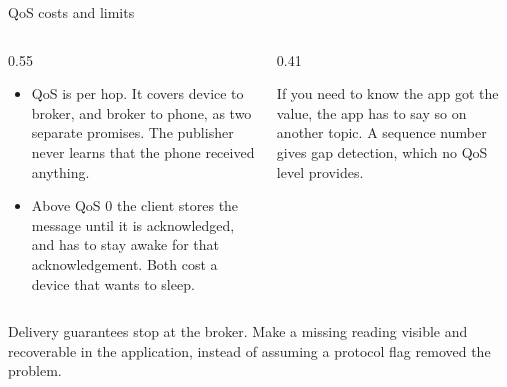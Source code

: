 \documentclass[10pt,aspectratio=169,t]{beamer}
\begin{document}
\begin{frame}[embedded,eyebrow=MQTT]{QoS costs and limits}
  \vskip 2mm
  \begin{columns}[T]
    \begin{column}{0.55\textwidth}
      \begin{itemize}
        \item QoS is per hop. It covers device to broker, and broker to phone, as two separate promises. The publisher never learns that the phone received anything.
        \item Above QoS 0 the client stores the message until it is acknowledged, and has to stay awake for that acknowledgement. Both cost a device that wants to sleep.
      \end{itemize}
    \end{column}
    \begin{column}{0.41\textwidth}
      \begin{hint}
        If you need to know the app got the value, the app has to say so on another topic. A sequence number gives gap detection, which no QoS level provides.
      \end{hint}
    \end{column}
  \end{columns}
  \begin{takeaway}{Delivery guarantees stop at the broker.}
    Make a missing reading visible and recoverable in the application, instead of assuming a protocol flag removed the problem.
  \end{takeaway}
\end{frame}
\end{document}

